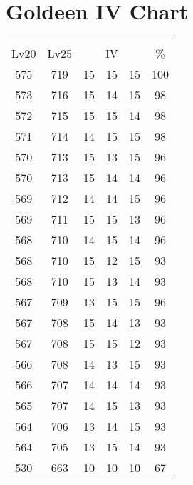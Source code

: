 \documentclass{article}%
\begin{document}
%
\normalsize%
\section{Goldeen IV Chart}%
\label{sec:Goldeen IV Chart}%
\renewcommand{\arraystretch}{1.5}%
\begin{tabular}{|c|c|c|c|c|c|}%
\hline%
\multicolumn{6}{|c|}{\textcolor{white}{ 
\linebreak{Goldeen}
}%
\cellcolor{black}}\\%
\multicolumn{1}{|c}{Lv20}&\multicolumn{1}{c|}{Lv25}&\multicolumn{3}{c|}{IV}&\multicolumn{1}{|c|}{\%}\\%
\hline%
\rowcolor{color100}%
575&719&15&15&15&100\\%
\hline%
\rowcolor{color98}%
573&716&15&14&15&98\\%
\hline%
\rowcolor{color98}%
572&715&15&15&14&98\\%
\hline%
\rowcolor{color98}%
571&714&14&15&15&98\\%
\hline%
\rowcolor{color96}%
570&713&15&13&15&96\\%
\hline%
\rowcolor{color96}%
570&713&15&14&14&96\\%
\hline%
\rowcolor{color96}%
569&712&14&14&15&96\\%
\hline%
\rowcolor{color96}%
569&711&15&15&13&96\\%
\hline%
\rowcolor{color96}%
568&710&14&15&14&96\\%
\hline%
\rowcolor{color93}%
568&710&15&12&15&93\\%
\hline%
\rowcolor{color93}%
568&710&15&13&14&93\\%
\hline%
\rowcolor{color96}%
567&709&13&15&15&96\\%
\hline%
\rowcolor{color93}%
567&708&15&14&13&93\\%
\hline%
\rowcolor{color93}%
567&708&15&15&12&93\\%
\hline%
\rowcolor{color93}%
566&708&14&13&15&93\\%
\hline%
\rowcolor{color93}%
566&707&14&14&14&93\\%
\hline%
\rowcolor{color93}%
565&707&14&15&13&93\\%
\hline%
\rowcolor{color93}%
564&706&13&14&15&93\\%
\hline%
\rowcolor{color93}%
564&705&13&15&14&93\\%
\hline%
\rowcolor{color91}%
530&663&10&10&10&67\\%
\end{tabular}

%
\end{document}
